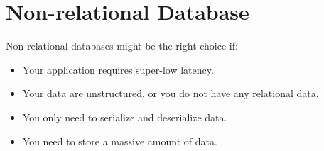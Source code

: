 \documentclass[letterpaper, oneside]{book}
\theoremstyle{definition}
\theoremstyle{remark}
\begin{document}
\chapter{Non-relational Database}

Non-relational databases might be the right choice if:
\begin{itemize}
    \item Your application requires super-low latency.
    \item Your data are unstructured, or you do not have any relational data.
    \item You only need to serialize and deserialize data.
    \item You need to store a massive amount of data.
\end{itemize}
\end{document}
